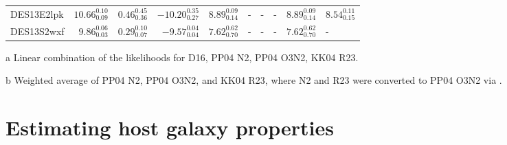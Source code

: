 \documentclass[fleqn,usenatbib,]{mnras}
\begin{document}
\begin{table}
\begin{threeparttable}
\begin{tabular}{lrrrllllll}
DES13E2lpk  &  $10.66 _{\scriptscriptstyle 0.09} ^{\scriptscriptstyle 0.10}$ &   $0.46 _{\scriptscriptstyle 0.36} ^{\scriptscriptstyle 0.45}$ &  $-10.20 _{\scriptscriptstyle 0.27} ^{\scriptscriptstyle 0.35}$ &  $8.89 _{\scriptscriptstyle 0.14} ^{\scriptscriptstyle 0.09}$ &                                                             - &                                                             - &                                                             - &  $8.89 _{\scriptscriptstyle 0.14} ^{\scriptscriptstyle 0.09}$ &  $8.54 _{\scriptscriptstyle 0.15} ^{\scriptscriptstyle 0.11}$ \\
DES13S2wxf  &   $9.86 _{\scriptscriptstyle 0.03} ^{\scriptscriptstyle 0.06}$ &   $0.29 _{\scriptscriptstyle 0.07} ^{\scriptscriptstyle 0.10}$ &   $-9.57 _{\scriptscriptstyle 0.04} ^{\scriptscriptstyle 0.04}$ &  $7.62 _{\scriptscriptstyle 0.70} ^{\scriptscriptstyle 0.62}$ &                                                             - &                                                             - &                                                             - &  $7.62 _{\scriptscriptstyle 0.70} ^{\scriptscriptstyle 0.62}$ &                                                             - \\
\bottomrule
\end{tabular}
\begin{tablenotes}
\item[a] Linear combination of the likelihoods for D16, PP04 N2, PP04 O3N2, KK04 R23.
\item[b] Weighted average of PP04 N2, PP04 O3N2, and KK04 R23, where N2 and R23 were converted to PP04 O3N2 via \citet{Kewley2008}.

\end{tablenotes}
\end{threeparttable}
\label{tab:derived}
\end{table}

\section{Estimating host galaxy properties}
\label{sec:measure}
\end{document}
